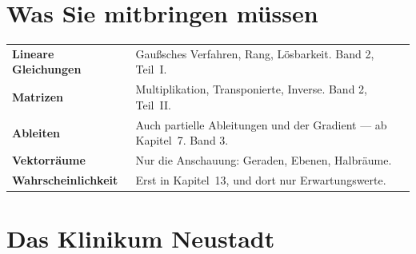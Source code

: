 \section*{Was Sie mitbringen müssen}

\begin{merksatz}
\begin{center}
{\small
\renewcommand{\arraystretch}{1.5}
\begin{tabular}{@{}P{3.0cm}P{5.6cm}@{}}
\toprule
\textbf{Lineare Gleichungen} & Gaußsches Verfahren, Rang, Lösbarkeit. Band 2, Teil~I.\\
\textbf{Matrizen} & Multiplikation, Transponierte, Inverse. Band 2, Teil~II.\\
\textbf{Ableiten} & Auch partielle Ableitungen und der Gradient --- ab Kapitel~7. Band 3.\\
\textbf{Vektorräume} & Nur die Anschauung: Geraden, Ebenen, Halbräume.\\
\textbf{Wahrschein\-lichkeit} & Erst in Kapitel~13, und dort nur Erwartungswerte.\\
\bottomrule
\end{tabular}}
\end{center}

\begin{center}
\begin{minipage}{0.88\textwidth}
\end{minipage}
\end{center}
\end{merksatz}

\section*{Das Klinikum Neustadt}


